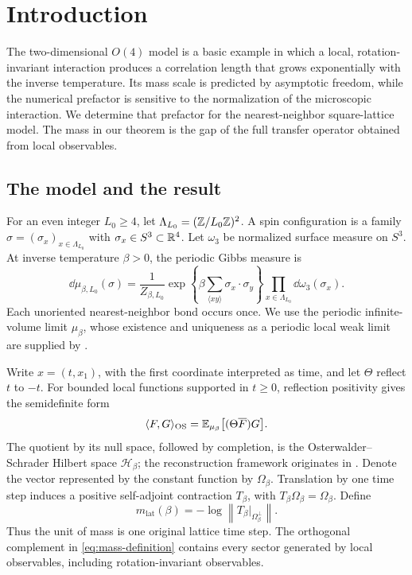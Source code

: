\section{Introduction}\label{sec:introduction}

The two-dimensional \(O(4)\) model is a basic example in which a local,
rotation-invariant interaction produces a correlation length that grows
exponentially with the inverse temperature. Its mass scale is predicted by
asymptotic freedom, while the numerical prefactor is sensitive to the
normalization of the microscopic interaction. We determine that prefactor for
the nearest-neighbor square-lattice model. The mass in our theorem is the gap
of the full transfer operator obtained from local observables.

\subsection{The model and the result}

For an even integer \(L_0\geq4\), let
\(\Lambda_{L_0}=(\mathbb Z/L_0\mathbb Z)^2\). A spin configuration is a family
\(\sigma=(\sigma_x)_{x\in\Lambda_{L_0}}\) with \(\sigma_x\in S^3\subset\mathbb R^4\).
Let \(\omega_3\) be normalized surface measure on \(S^3\). At inverse
temperature \(\beta>0\), the periodic Gibbs measure is
\begin{equation}\label{eq:gibbs}
 \dd\mu_{\beta,L_0}(\sigma)
 =\frac{1}{Z_{\beta,L_0}}
   \exp\!\left\{\beta\sum_{\langle xy\rangle}
                    \sigma_x\cdot\sigma_y\right\}
   \prod_{x\in\Lambda_{L_0}}\dd\omega_3(\sigma_x).
\end{equation}
Each unoriented nearest-neighbor bond occurs once. We use the periodic
infinite-volume limit \(\mu_\beta\), whose existence and uniqueness as a
periodic local weak limit are supplied by \cite[Corollary~1.2]{SharpO4}.

Write \(x=(t,x_1)\), with the first coordinate interpreted as time, and let
\(\Theta\) reflect \(t\) to \(-t\). For bounded local functions supported in
\(t\geq0\), reflection positivity gives the semidefinite form
\begin{equation}\label{eq:os-form}
 \langle F,G\rangle_{\mathrm{OS}}
   =\mathbb E_{\mu_\beta}\bigl[(\Theta\overline F)G\bigr].
\end{equation}
The quotient by its null space, followed by completion, is the
Osterwalder--Schrader Hilbert space \(\mathcal H_\beta\); the reconstruction
framework originates in \cite{OsterwalderSchrader1973}. Denote the vector
represented by the constant function by \(\Omega_\beta\). Translation by one
time step induces a positive self-adjoint contraction \(T_\beta\), with
\(T_\beta\Omega_\beta=\Omega_\beta\). Define
\begin{equation}\label{eq:mass-definition}
 m_{\mathrm{lat}}(\beta)
   =-\log\left\|T_\beta\big|_{\Omega_\beta^\perp}\right\|.
\end{equation}
Thus the unit of mass is one original lattice time step. The orthogonal
complement in \eqref{eq:mass-definition} contains every sector generated by
local observables, including rotation-invariant observables.

